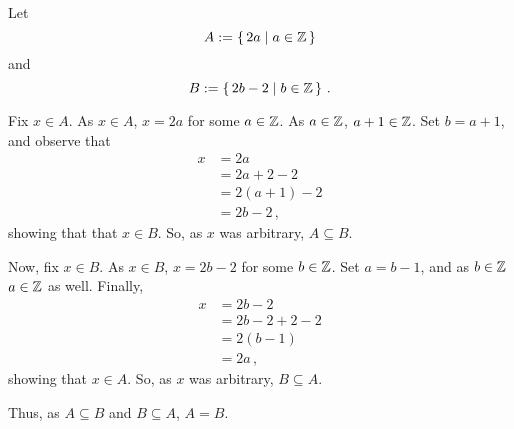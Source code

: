 \guard




\begin{exmp}
\label{exmp:setEqualityBySubsets}
  Let \[ A := \left\{\, 2a \mid a\in\mathbb{Z} \,\right\} \] and \[ B := \left\{\, 2b-2\mid b\in\mathbb{Z} \,\right\}\,. \]

  Fix $x\in A$.
  As $x\in A$, $x=2a$ for some $a\in\mathbb{Z}$.
  As $a\in\mathbb{Z}$, $a+1\in\mathbb{Z}$.
  Set $b = a+1$, and observe that
  \begin{align*}
    x &= 2a \\
      &= 2a + 2 - 2 \\
      &= 2(a+1) - 2 \\
      &= 2b - 2\,,
  \end{align*}
  showing that that $x\in B$.
  So, as $x$ was arbitrary, $A\subseteq B$.

  Now, fix $x\in B$.
  As $x\in B$, $x = 2b-2$ for some $b\in \mathbb{Z}$.
  Set $a = b-1$, and as $b\in\mathbb{Z}$ $a\in\mathbb{Z}$ as well.
  Finally,
  \begin{align*}
    x &= 2b-2 \\
      &= 2b - 2 + 2 - 2 \\
      &= 2(b-1) \\
      &= 2a\,,
  \end{align*}
  showing that $x\in A$.
  So, as $x$ was arbitrary, $B\subseteq A$.

  Thus, as $A\subseteq B$ and $B\subseteq A$, $A=B$.
\end{exmp}
